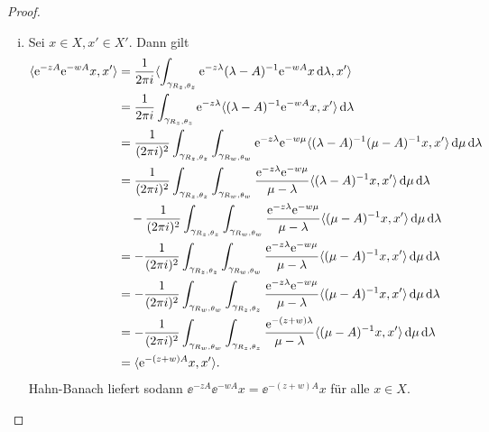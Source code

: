 \begin{proof}
\begin{enumerate}[(i)]
    \item Sei $x \in X, x' \in X'$.
      Dann gilt
      \begin{align*}
        \langle \ee^{-zA} \ee^{-wA} x, x' \rangle
        &= \frac{1}{2\pi i} \langle \int_{\gamma_{R_z, \theta_z}} \ee^{-z\lambda} (\lambda - A)^{-1} \ee^{-wA} x \d \lambda, x' \rangle \\
        &= \frac{1}{2\pi i} \int_{\gamma_{R_z, \theta_z}} \ee^{-z\lambda} \langle (\lambda - A)^{-1} \ee^{-wA} x, x' \rangle \d \lambda\\
        &= \frac{1}{(2\pi i)^2} \int_{\gamma_{R_z, \theta_z}} \int_{\gamma_{R_w, \theta_w}}  \ee^{-z\lambda} \ee^{-w \mu} \langle (\lambda - A)^{-1} (\mu - A)^{-1} x, x' \rangle \d \mu \d \lambda\\
        &= \frac{1}{(2\pi i)^2} \int_{\gamma_{R_z, \theta_z}} \int_{\gamma_{R_w, \theta_w}}  \frac{\ee^{-z\lambda} \ee^{-w \mu}}{\mu - \lambda} \langle (\lambda - A)^{-1} x, x' \rangle \d \mu \d \lambda\\
        &\quad - \frac{1}{(2\pi i)^2} \int_{\gamma_{R_z, \theta_z}} \int_{\gamma_{R_w, \theta_w}}  \frac{\ee^{-z\lambda} \ee^{-w \mu}}{\mu - \lambda} \langle (\mu - A)^{-1} x, x' \rangle \d \mu \d \lambda\\
        &= - \frac{1}{(2\pi i)^2} \int_{\gamma_{R_z, \theta_z}} \int_{\gamma_{R_w, \theta_w}}  \frac{\ee^{-z\lambda} \ee^{-w \mu}}{\mu - \lambda} \langle (\mu - A)^{-1} x, x' \rangle \d \mu \d \lambda\\
        &= - \frac{1}{(2\pi i)^2} \int_{\gamma_{R_w, \theta_w}} \int_{\gamma_{R_z, \theta_z}}  \frac{\ee^{-z\lambda} \ee^{-w \mu}}{\mu - \lambda} \langle (\mu - A)^{-1} x, x' \rangle \d \mu \d \lambda\\
        &= - \frac{1}{(2\pi i)^2} \int_{\gamma_{R_w, \theta_w}} \int_{\gamma_{R_z, \theta_z}}  \frac{\ee^{-(z+ w)\lambda}}{\mu - \lambda} \langle (\mu - A)^{-1} x, x' \rangle \d \mu \d \lambda\\
        &= \langle \ee^{-(z + w)A} x, x' \rangle.
      \end{align*}
      Hahn-Banach liefert sodann $\ee^{-zA}\ee^{-wA} x = \ee^{-(z + w)A}x$ für alle $x \in X$.


\end{enumerate}
\end{proof}

